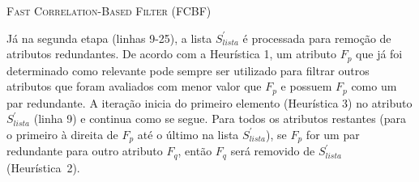 
\begin{algorithm}[!htb]
   \SetAlgoLined

   \caption{\textsc{Fast Correlation-Based Filter (FCBF)}}\label{alg:fcbf}
 \end{algorithm}

Já na segunda etapa (linhas 9-25), a lista $S_{lista}^{'}$ é processada para remoção de atributos redundantes. De acordo com a Heurística 1, um atributo $F_p$ que já foi determinado como relevante pode sempre ser utilizado para filtrar outros atributos que foram avaliados com menor valor que $F_p$ e possuem $F_p$ como um par redundante. A iteração inicia do primeiro elemento (Heurística 3) no atributo $S_{lista}^{'}$ (linha 9) e continua como se segue. Para todos os atributos restantes (para o primeiro à direita de $F_p$ até o último na lista $S_{lista}^{'}$), se $F_p$ for um par redundante para outro atributo $F_q$, então $F_q$ será removido de $S_{lista}^{'}$ (Heurística~2).

